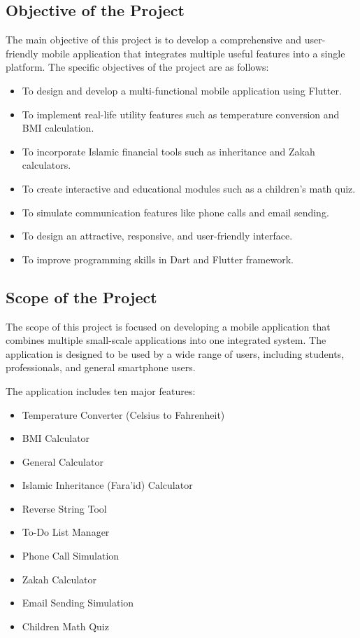 \documentclass{article}
\begin{document}
\subsection{Objective of the Project}

The main objective of this project is to develop a comprehensive and user-friendly mobile application that integrates multiple useful features into a single platform. The specific objectives of the project are as follows:

\begin{itemize}
\item To design and develop a multi-functional mobile application using Flutter.
\item To implement real-life utility features such as temperature conversion and BMI calculation.
\item To incorporate Islamic financial tools such as inheritance and Zakah calculators.
\item To create interactive and educational modules such as a children's math quiz.
\item To simulate communication features like phone calls and email sending.
\item To design an attractive, responsive, and user-friendly interface.
\item To improve programming skills in Dart and Flutter framework.
\end{itemize}

\subsection{Scope of the Project}

The scope of this project is focused on developing a mobile application that combines multiple small-scale applications into one integrated system. The application is designed to be used by a wide range of users, including students, professionals, and general smartphone users.

The application includes ten major features:
\begin{itemize}
\item Temperature Converter (Celsius to Fahrenheit)
\item BMI Calculator
\item General Calculator
\item Islamic Inheritance (Fara’id) Calculator
\item Reverse String Tool
\item To-Do List Manager
\item Phone Call Simulation
\item Zakah Calculator
\item Email Sending Simulation
\item Children Math Quiz
\end{itemize}
\end{document}
